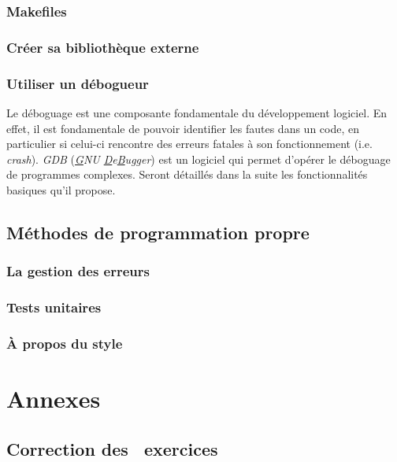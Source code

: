 \documentclass[french]{minitelreport}
\newcounter{exercisescounter}
\begin{document}
		\section{Makefiles}
		
		\section{Créer sa bibliothèque externe}
		\section{Utiliser un débogueur}
		Le déboguage est une composante fondamentale du développement logiciel. En effet, il est fondamentale de pouvoir identifier les fautes dans un code, en particulier si celui-ci rencontre des erreurs fatales à son fonctionnement (i.e. \textit{crash}). \textit{GDB} (\textit{\underline{G}NU \underline{D}e\underline{B}ugger}) est un logiciel qui permet d'opérer le déboguage de programmes complexes. Seront détaillés dans la suite les fonctionnalités basiques qu'il propose.
	\chapter{Méthodes de programmation propre}
		\section{La gestion des erreurs}
		
		\section{Tests unitaires}
		
		\section{À propos du style}
		
\part{Annexes}
\chapter{Correction des \theexercisescounter\ exercices}
	
\printbibheading
\printbibliography[type=book,heading=subbibliography,title={Livres}]
\printbibliography[type=manual, heading=subbibliography, title={Manuels et documentation}]
\printbibliography[type=online, heading=subbibliography, title={Autres liens}]
\end{document}
